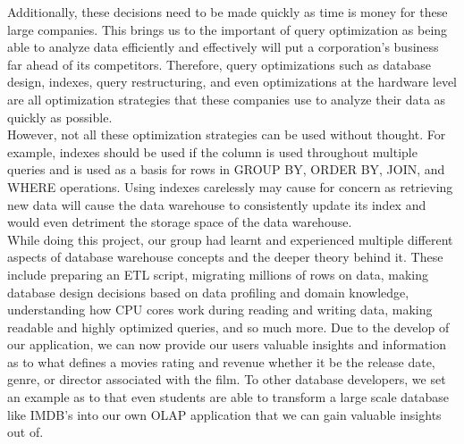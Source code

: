 Additionally, these decisions need to be made quickly as time is money for these large companies. This brings us to the important of query optimization as being able to analyze data
efficiently and effectively will put a corporation's business far ahead of its competitors. Therefore, query optimizations such as database design, indexes, query restructuring, and
even optimizations at the hardware level are all optimization strategies that these companies use to analyze their data as quickly as possible. \\

However, not all these optimization strategies can be used without thought. For example, indexes should be used if the column is used throughout multiple queries and is used as a basis
for rows in GROUP BY, ORDER BY, JOIN, and WHERE operations. Using indexes carelessly may cause for concern as retrieving new data will cause the data warehouse to consistently update
its index and would even detriment the storage space of the data warehouse. \\

While doing this project, our group had learnt and experienced multiple different aspects of database warehouse concepts and the deeper theory behind it. These include preparing an ETL
script, migrating millions of rows on data, making database design decisions based on data profiling and domain knowledge, understanding how CPU cores work during reading and writing data,
making readable and highly optimized queries, and so much more. Due to the develop of our application, we can now provide our users valuable insights and information as to what defines a
movies rating and revenue whether it be the release date, genre, or director associated with the film. To other database developers, we set an example as to that even students are able to
transform a large scale database like IMDB's into our own OLAP application that we can gain valuable insights out of. 